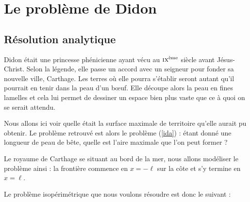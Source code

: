 \documentclass[10pt,a4paper]{article}
\theoremstyle{plain}
\theoremstyle{definition}
\begin{document}
\section{Le problème de Didon}
\label{sec:didon}

\subsection{Résolution analytique}

Didon était une princesse phénicienne ayant vécu au $\textsc{ix}^\text{ème}$ siècle avant Jésus-Christ. Selon la légende, elle passe un accord avec un seigneur pour fonder sa nouvelle ville, Carthage. Les terres où elle pourra s'établir seront \og autant qu'il pourrait en tenir dans la peau d'un b\oe{}uf\fg{}. Elle découpe alors la peau en fines lamelles et cela lui permet de dessiner un espace bien plus vaste que ce à quoi on se serait attendu.

Nous allons ici voir quelle était la surface maximale de territoire qu'elle aurait pu obtenir. Le problème retrouvé est alors le problème (\ref{ida}) : étant donné une longueur de peau de bête, quelle est l'aire maximale que l'on peut former ?


Le royaume de Carthage se situant au bord de la mer, nous allons modéliser le problème ainsi : la frontière commence en $x=-\ell$ sur la côte et s'y termine en $x=\ell$.

\begin{center}


\end{center}



Le problème isopérimétrique que nous voulons résoudre est donc le suivant :
\end{document}
